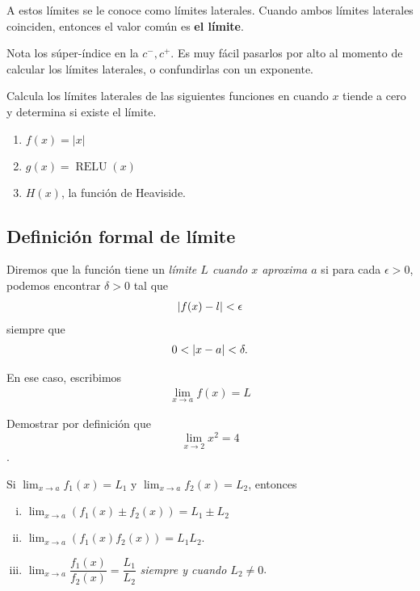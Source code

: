 \begin{observacion}
	A estos límites se le conoce como límites laterales. Cuando ambos límites laterales coinciden, entonces el valor común es \textbf{el límite}.
\end{observacion}

\begin{observacion}
	Nota los súper-índice en la $ c^{-}, c^{+} $. Es muy fácil pasarlos por alto al momento de calcular los límites laterales, o confundirlas con un exponente.
\end{observacion}

\begin{resuelto}
	Calcula los límites laterales de las siguientes funciones en cuando $ x $ tiende a cero y determina si existe el límite.
	\begin{enumerate}
		\item $ f(x) = |x| $
		\item $ g(x) = \operatorname{RELU}(x) $
		\item $ H(x) $, la función de Heaviside.
	\end{enumerate}
\end{resuelto}

\subsection{Definición formal de límite}

\begin{definicion}

	Diremos que la función tiene un \emph{límite $L$ cuando $x$ aproxima $a$} si para cada $\epsilon >0$, podemos encontrar $\delta >0$ tal que
	\begin{align*}
		\left|f(x)-l\right| < \epsilon
	\end{align*}
	siempre que
	\begin{align*}
		0 < \left|x-a\right| < \delta.
	\end{align*}

 En ese caso, escribimos
\begin{align*}
	\lim_{x \to a} f(x) = L
\end{align*}
\end{definicion}


\begin{resuelto}
	Demostrar por definición que $$\lim_{x\to 2}x^2=4$$.
\end{resuelto}


\begin{proposicion}

	Si $\lim_{x \to a}f_{1}(x)= L_{1}$ y $\lim_{x \to a }f_{2}(x)= L_{2}$, entonces
	\begin{enumerate}[(i)]
		\item $\lim_{x\to a}\left( f_{1}(x)\pm f_{2}(x) \right) = L_{1}\pm L_{2}$
		\item $\lim_{x\to a}\left( f_{1}(x) f_{2}(x)\right)= L_{1}L_{2}$.
		\item
		$\lim_{x \to a}\dfrac{f_{1}(x)}{f_{2}(x)} = \dfrac{L_{1}}{L_{2}}$
		\emph{siempre y cuando $L_{2}\neq 0$}.
	\end{enumerate}
\end{proposicion}


